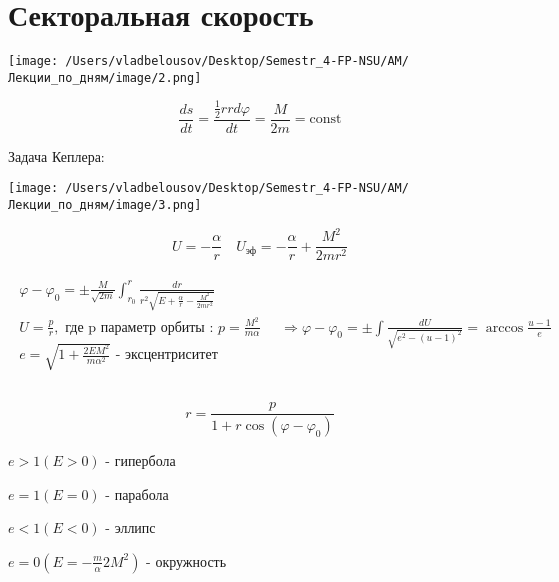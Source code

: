 \documentclass[12pt, a4paper]{report}
\begin{document}
\section{Секторальная скорость}

\begin{center}
    \texttt{[image: /Users/vladbelousov/Desktop/Semestr\_4-FP-NSU/АМ/Лекции\_по\_дням/image/2.png]}
\end{center}

    \[ \frac{ds }{dt}  = \frac{\frac{1}{2} r r d \varphi }{dt} = \frac{M}{2m} = \mathrm{const}               \] 

Задача Кеплера: 

\begin{center}
    \texttt{[image: /Users/vladbelousov/Desktop/Semestr\_4-FP-NSU/АМ/Лекции\_по\_дням/image/3.png]}
\end{center}

\[ U = -\frac{\alpha}{r} \quad  U _{\text{эф} } = - \frac{\alpha}{r} + \frac{M ^2 }{2 mr ^2 }    \] 

\[ \begin{aligned}
    \begin{array}{l}
        \displaystyle \varphi - \varphi_0 = \pm  \frac{M}{\sqrt{2m}} \int_{ r_0}^{r}  \frac{dr}{ r ^2 \sqrt{E + \frac{\alpha}{ r} - \frac{M ^2 }{2mr ^2 }  }} \\
        U = \frac{p}{ r}, \text{ где p параметр орбиты : }   p = \frac{M ^2 }{m \alpha} \\
        e = \sqrt{ 1 + \frac{2E M ^2 }{m \alpha ^2} } \text{ - эксцентриситет} \\
    \end{array}
    \quad  \Rightarrow \varphi - \varphi_0 = \pm  \int  \frac{dU}{\sqrt{ e ^2 - ( u -1 ) ^2 }}= \arccos {\frac{u-1}{e} } \\ 
\end{aligned}  \] 

\begin{center}
    \[ r= \frac{p}{1 + r \cos  ( \varphi - \varphi_0)} \] 

\( e>1 ( E >0) \) - гипербола 

\( e=1  ( E=0) \) - парабола

\( e<1 ( E<0) \) - эллипс 

\( e = 0 ( E = - \frac{m} \alpha{2 M ^2} ) \) - окружность
\end{center}



\ifdefined\mainfile
\else
    
\end{document}
